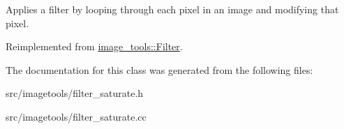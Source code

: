 Applies a filter by looping through each pixel in an image and modifying that pixel. 

Reimplemented from \hyperlink{classimage__tools_1_1Filter_a68d38fa12b87e20b81090cb380c0a307}{image\+\_\+tools\+::\+Filter}.



The documentation for this class was generated from the following files\+:\begin{DoxyCompactItemize}
\item 
src/imagetools/filter\+\_\+saturate.\+h\item 
src/imagetools/filter\+\_\+saturate.\+cc\end{DoxyCompactItemize}
